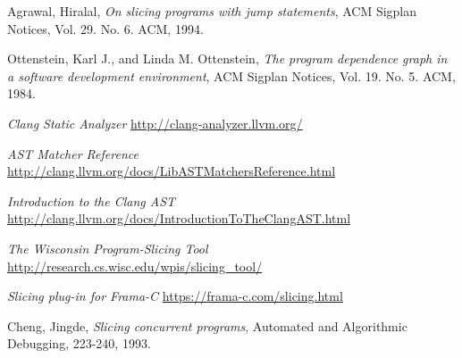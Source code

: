 \documentclass[oneside,12pt,a4paper]{book}
\begin{document}
\begin{thebibliography}{Textttext}
  Agrawal, Hiralal,
  \emph{On slicing programs with jump statements},
  ACM Sigplan Notices,
  Vol. 29. No. 6. ACM,
  1994.

  Ottenstein, Karl J., and Linda M. Ottenstein,
  \emph{The program dependence graph in a software development environment},
  ACM Sigplan Notices,
  Vol. 19. No. 5. ACM,
  1984.
  
  \emph{Clang Static Analyzer}
  \url{http://clang-analyzer.llvm.org/}

  \emph{AST Matcher Reference}
  \url{http://clang.llvm.org/docs/LibASTMatchersReference.html}
  
  \emph{Introduction to the Clang AST}
  \url{http://clang.llvm.org/docs/IntroductionToTheClangAST.html}
  
  \emph{The Wisconsin Program-Slicing Tool}
  \url{http://research.cs.wisc.edu/wpis/slicing_tool/}

  \emph{Slicing plug-in for Frama-C}
  \url{https://frama-c.com/slicing.html}
  
  Cheng, Jingde,
  \emph{Slicing concurrent programs},
  Automated and Algorithmic Debugging, 
  223-240,
  1993.

\end{thebibliography}
\end{document}
